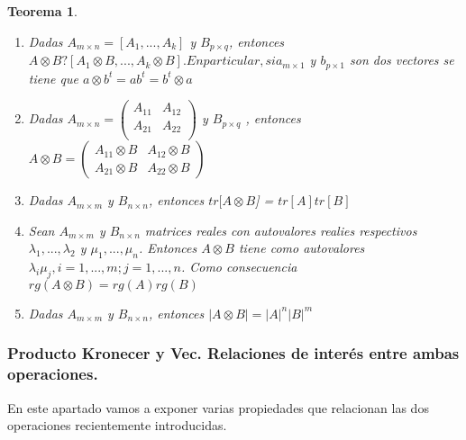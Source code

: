 \documentclass{article}
\theoremstyle{theorem-style}  %
\newtheorem{theorem}{Teorema}[section]  %
\theoremstyle{definition}
\theoremstyle{example-style}
\begin{document}
\begin{theorem}
\begin{enumerate}
			\item \textit{Dadas $A_{m \times n} = [A_1, ..., A_k]$ y $B_{p \times q}$, entonces $A \otimes B ? [A_1 \otimes B, ..., A_k \otimes B]. En particular, si a_{m \times 1}$ y $b_{p \times 1}$ son dos vectores se tiene que $a \otimes b^t = ab^t = b^t \otimes a$ }
			
			\item \textit{Dadas $A_{m \times n} =\left( {\begin{array}{cc}
						A_{11} & A_{12}\\
						A_{21} & A_{22}\\
				\end{array}}\right)$ 			 y $B_{p \times q}$ , entonces $A \otimes B = \left( {\begin{array}{cc}
					A_{11} \otimes B & A_{12} \otimes B\\
					A_{21}  \otimes B & A_{22} \otimes B
					\end{array}}\right)  $}
			
			\item \textit{Dadas $A_{m \times m}$ y $B_{n \times n}$, entonces $tr[A \otimes B$] = $tr[A]tr[B]$}
			
			\item \textit{Sean $A_{m \times m}$ y $B_{n \times n}$ matrices reales con autovalores realies respectivos $\lambda_1, ..., \lambda_2$ y $\mu_1, ..., \mu_n$. Entonces $A \otimes B$ tiene como autovalores $\lambda_i \mu_j, i = 1, ..., m; j = 1,...,n$. Como consecuencia $rg(A \otimes B) = rg(A)rg(B)$}
			
			\item \textit{Dadas $A_{m \times m }$ y $B_{n \times n}$, entonces $|A \otimes B| = |A|^n |B|^m$}
			
			
		\end{enumerate}
	\end{theorem}
	
	
\subsubsection{Producto Kronecer y Vec. Relaciones de interés entre ambas operaciones.}
	
	En este apartado vamos a exponer varias propiedades que relacionan las dos operaciones recientemente introducidas.
	
\end{document}
